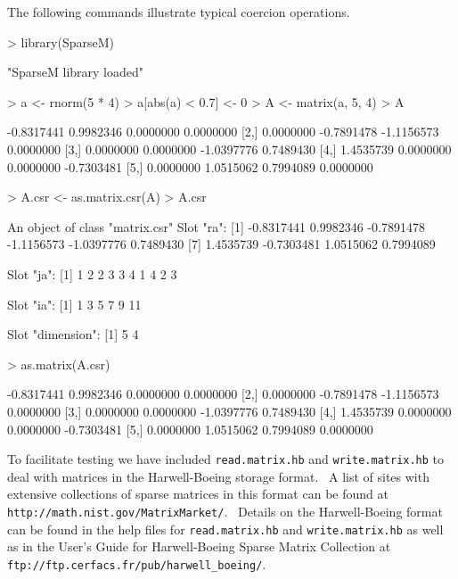 \documentclass{article}
\begin{document}
The following commands illustrate typical coercion operations.

\begin{Schunk}
\begin{Sinput}
> library(SparseM)
\end{Sinput}
\begin{Soutput}
[1] "SparseM library loaded"
\end{Soutput}
\begin{Sinput}
> a <- rnorm(5 * 4)
> a[abs(a) < 0.7] <- 0
> A <- matrix(a, 5, 4)
> A
\end{Sinput}
\begin{Soutput}
           [,1]       [,2]       [,3]       [,4]
[1,] -0.8317441  0.9982346  0.0000000  0.0000000
[2,]  0.0000000 -0.7891478 -1.1156573  0.0000000
[3,]  0.0000000  0.0000000 -1.0397776  0.7489430
[4,]  1.4535739  0.0000000  0.0000000 -0.7303481
[5,]  0.0000000  1.0515062  0.7994089  0.0000000
\end{Soutput}
\begin{Sinput}
> A.csr <- as.matrix.csr(A)
> A.csr
\end{Sinput}
\begin{Soutput}
An object of class "matrix.csr"
Slot "ra":
 [1] -0.8317441  0.9982346 -0.7891478 -1.1156573 -1.0397776  0.7489430
 [7]  1.4535739 -0.7303481  1.0515062  0.7994089

Slot "ja":
 [1] 1 2 2 3 3 4 1 4 2 3

Slot "ia":
[1]  1  3  5  7  9 11

Slot "dimension":
[1] 5 4
\end{Soutput}
\begin{Sinput}
> as.matrix(A.csr)
\end{Sinput}
\begin{Soutput}
           [,1]       [,2]       [,3]       [,4]
[1,] -0.8317441  0.9982346  0.0000000  0.0000000
[2,]  0.0000000 -0.7891478 -1.1156573  0.0000000
[3,]  0.0000000  0.0000000 -1.0397776  0.7489430
[4,]  1.4535739  0.0000000  0.0000000 -0.7303481
[5,]  0.0000000  1.0515062  0.7994089  0.0000000
\end{Soutput}
\end{Schunk}
To facilitate testing we have included \texttt{read.matrix.hb} 
and \texttt{write.matrix.hb} to deal with matrices
in the Harwell-Boeing storage format.  \ A list of sites with
extensive collections of sparse matrices  in this format can be found at
\texttt{http://math.nist.gov/MatrixMarket/}. \ Details on the Harwell-Boeing format can
be found in the help files for \texttt{read.matrix.hb} and \texttt{write.matrix.hb} as well
as in the User's Guide for Harwell-Boeing Sparse Matrix Collection at
\texttt{ftp://ftp.cerfacs.fr/pub/harwell\_boeing/}.
\end{document}
